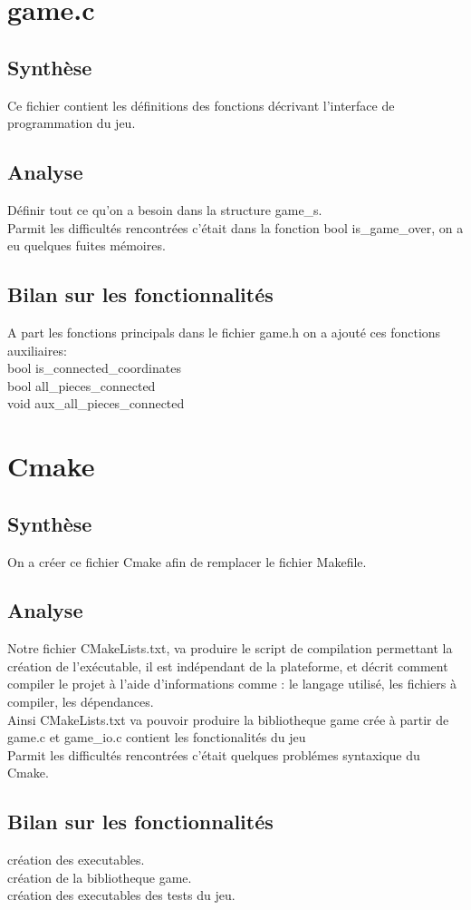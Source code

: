 \documentclass[12pt]{article}
\begin{document}
\section{game.c}
\subsection{Synthèse}
Ce fichier contient les définitions des fonctions décrivant l'interface de programmation du jeu.
\subsection{Analyse}
Définir tout ce qu'on a besoin dans la structure game\_s.\\
Parmit les difficultés rencontrées c'était dans la fonction bool is\_game\_over, on a eu quelques fuites mémoires.\\
\subsection{Bilan sur les fonctionnalités}
A part les fonctions principals dans le fichier game.h on a ajouté ces fonctions auxiliaires:\\
bool is\_connected\_coordinates\\
bool all\_pieces\_connected\\
void aux\_all\_pieces\_connected\\



\section{Cmake}
\subsection{Synthèse}
On a créer ce fichier Cmake afin de remplacer le fichier Makefile.
\subsection{Analyse}
Notre fichier CMakeLists.txt, va produire le script de compilation permettant la création de l'exécutable,
il est indépendant de la plateforme, et décrit comment compiler le projet à l'aide d'informations comme : le langage utilisé, les fichiers à compiler, les dépendances.\\
Ainsi CMakeLists.txt va pouvoir produire la bibliotheque game crée à partir de game.c et game\_io.c contient les fonctionalités du jeu\\
Parmit les difficultés rencontrées c'était quelques problémes syntaxique du Cmake.
\subsection{Bilan sur les fonctionnalités}
création des executables.\\ 
création de la bibliotheque game.\\ 
création des executables des tests du jeu.\\ 
\end{document}
